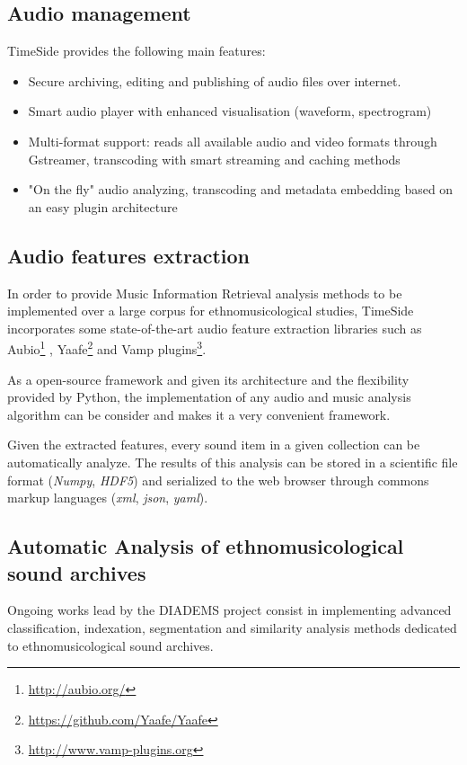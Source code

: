 \documentclass{paper}
\begin{document}
\subsection{Audio management}
TimeSide provides the following main features:
\begin{itemize}
\item Secure archiving, editing and publishing of audio files over
  internet.
\item Smart audio player with enhanced visualisation (waveform, spectrogram)
\item Multi-format support: reads all available audio and video formats  through Gstreamer, transcoding with smart streaming and caching methods%
\item "On the fly" audio analyzing, transcoding and metadata
    embedding based on an easy plugin architecture
\end{itemize}

\subsection{Audio features extraction}
In order to provide Music Information Retrieval analysis methods to be implemented over a large corpus for ethnomusicological studies, TimeSide incorporates some state-of-the-art audio feature extraction libraries such as Aubio\footnote{\url{http://aubio.org/}} \citep{brossierPhD}, Yaafe\footnote{\url{https://github.com/Yaafe/Yaafe}} \citep{yaafe_ISMIR2010} and Vamp plugins\footnote{ \url{http://www.vamp-plugins.org}}.

As a open-source framework and given its architecture and the flexibility provided by Python, the implementation of any audio and music analysis algorithm can be consider and makes it a very convenient framework.

Given the extracted features, every sound item in a given collection can be automatically analyze. The results of this analysis can be stored in a scientific file format (\emph{Numpy}, \emph{HDF5}) and serialized to the web browser through commons markup languages (\emph{xml}, \emph{json}, \emph{yaml}).


\subsection{Automatic Analysis of ethnomusicological sound archives}
Ongoing works lead by the DIADEMS project consist in implementing advanced classification, indexation, segmentation and  similarity analysis methods dedicated to ethnomusicological sound archives.
\end{document}
